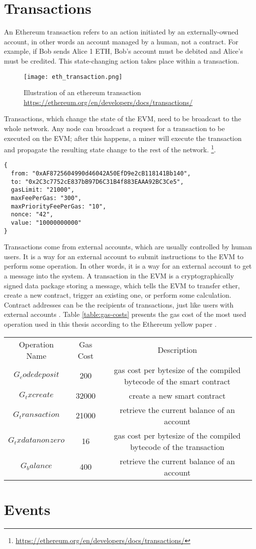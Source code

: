 \section{Transactions}
An Ethereum transaction refers to an action initiated by an externally-owned account, in other words an account managed by a human, not a contract. For example, if Bob sends Alice 1 ETH, Bob's account must be debited and Alice's must be credited. This state-changing action takes place within a transaction. 
\begin{figure}[h]
    \caption{Illustration of an ethereum transaction \url{https://ethereum.org/en/developers/docs/transactions/}}
    \centering
    \texttt{[image: eth\_transaction.png]}
\end{figure}
Transactions, which change the state of the EVM, need to be broadcast to the whole network. Any node can broadcast a request for a transaction to be executed on the EVM; after this happens, a miner will execute the transaction and propagate the resulting state change to the rest of the network. \footnote{\url{https://ethereum.org/en/developers/docs/transactions/}}.
\begin{verbatim}
{
  from: "0xAF8725604990d46042A50EfD9e2cB118141Bb140",
  to: "0x2C3c7752cE837bB97D6C31B4f883EAAA92BC3Ce5",
  gasLimit: "21000",
  maxFeePerGas: "300",
  maxPriorityFeePerGas: "10",
  nonce: "42",
  value: "10000000000"
}
\end{verbatim}
Transactions come from external accounts, which are usually controlled by human users. It is a way for an external account to submit instructions to the EVM to perform some operation. In other words, it is a way for an external account to get a message into the system. A transaction in the EVM is a cryptographically signed data package storing a message, which tells the EVM to transfer ether, create a new contract, trigger an existing one, or perform some calculation. Contract addresses can be the recipients of transactions, just like users with external accounts \cite[60]{dannen2017introducing}. 
Table \ref{table:gas-costs} presents the gas cost of the most used operation used in this thesis according to the Ethereum yellow paper \cite[27]{wood2014ethereum}.
\begin{center}
    \begin{tabular}{ c c c }\label{table:gas-costs}
     Operation Name & Gas Cost & Description \\ 
     $G_codedeposit$ & 200 & gas cost per bytesize of the compiled bytecode of the smart contract \\  
     $G_txcreate$ & 32000 & create a new smart contract  \\   
     $G_transaction$ & 21000 & retrieve the current balance of an account \\
     $G_txdatanonzero$ & 16 & gas cost per bytesize of the compiled bytecode of the transaction  \\   
     $G_balance$ & 400 & retrieve the current balance of an account 
    \end{tabular}
\end{center}
\section{Events}
\label{sec:events}
